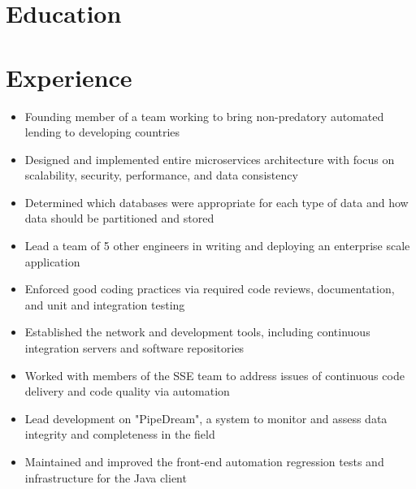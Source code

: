 \documentclass[11pt,letterpaper,sans]{moderncv}        %
\begin{document}
\makecvtitle

\vspace{-10mm}

\section{Education}

\section{Experience}

\begin{itemize}
\item Founding member of a team working to bring non-predatory automated lending to developing countries
\item Designed and implemented entire microservices architecture with focus on scalability, security, performance, and data consistency
\item Determined which databases were appropriate for each type of data and how data should be partitioned and stored
\item Lead a team of 5 other engineers in writing and deploying an enterprise scale application
\item Enforced good coding practices via required code reviews, documentation, and unit and integration testing
\item Established the network and development tools, including continuous integration servers and software repositories
\end{itemize}

\begin{itemize}
\item Worked with members of the SSE team to address issues of continuous code delivery and code quality via automation
\item Lead development on "PipeDream", a system to monitor and assess data integrity and completeness in the field
\item Maintained and improved the front-end automation regression tests and infrastructure for the Java client
\end{itemize}
\end{document}
